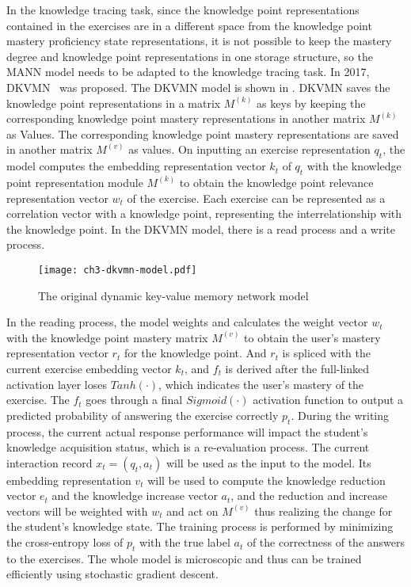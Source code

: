 In the knowledge tracing task, since the knowledge point representations contained in the exercises are in a different space from the knowledge point mastery proficiency state representations, it is not possible to keep the mastery degree and knowledge point representations in one storage structure, so the MANN model needs to be adapted to the knowledge tracing task. In 2017, DKVMN~\cite{zhang2017dynamic} was proposed. The DKVMN model is shown in \figname{\ref{fig:ch3-dkvmn-model}}. DKVMN saves the knowledge point representations in a matrix \(M^{(k)}\) as keys by keeping the corresponding knowledge point mastery representations in another matrix \(M^{(k)}\) as Values. The corresponding knowledge point mastery representations are saved in another matrix \(M^{(v)}\) as values. On inputting an exercise representation \(q_t\), the model computes the embedding representation vector \(k_t\) of \(q_t\) with the knowledge point representation module \(M^{(k)}\) to obtain the knowledge point relevance representation vector \(w_t\) of the exercise. Each exercise can be represented as a correlation vector with a knowledge point, representing the interrelationship with the knowledge point. In the DKVMN model, there is a read process and a write process.

\begin{figure}[htbp!]
    \texttt{[image: ch3-dkvmn-model.pdf]}
    \caption{The original dynamic key-value memory network model}\label{fig:ch3-dkvmn-model}
\end{figure}

In the reading process, the model weights and calculates the weight vector \(w_t\) with the knowledge point mastery matrix \(M^{(v)}\) to obtain the user's mastery representation vector \(r_t\) for the knowledge point. And \(r_t\) is spliced with the current exercise embedding vector \(k_t\), and \(f_t\) is derived after the full-linked activation layer loses \(Tanh(\cdot)\), which indicates the user's mastery of the exercise. The \(f_t\) goes through a final \(Sigmoid(\cdot)\) activation function to output a predicted probability of answering the exercise correctly \(p_t\). During the writing process, the current actual response performance will impact the student's knowledge acquisition status, which is a re-evaluation process. The current interaction record \(x_t=(q_t,a_t)\) will be used as the input to the model. Its embedding representation \(v_t\) will be used to compute the knowledge reduction vector \(e_t\) and the knowledge increase vector \(a_t\), and the reduction and increase vectors will be weighted with \(w_t\) and act on \(M^{(v)}\) thus realizing the change for the student's knowledge state. The training process is performed by minimizing the cross-entropy loss of \(p_t\) with the true label \(a_t\) of the correctness of the answers to the exercises. The whole model is microscopic and thus can be trained efficiently using stochastic gradient descent.

